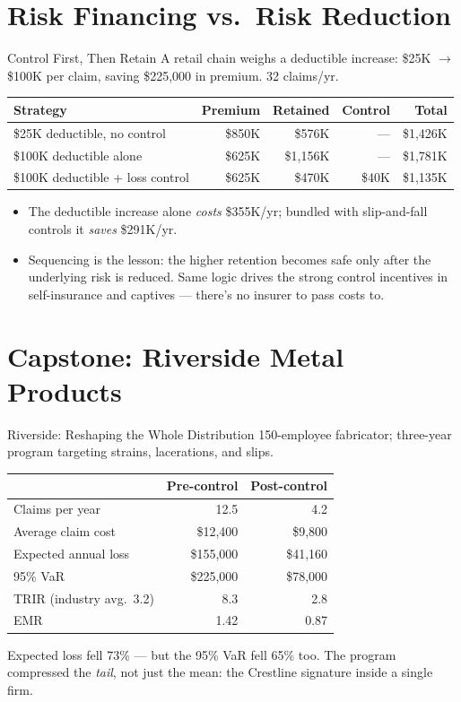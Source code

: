 \documentclass[11pt, aspectratio=169]{beamer}
\begin{document}
\section{Risk Financing vs.\ Risk Reduction}

\begin{frame}{Control First, Then Retain}
A retail chain weighs a deductible increase: \$25K $\rightarrow$ \$100K per claim, saving \$225{,}000 in premium. 32 claims/yr.
\medskip
\begin{center}
\small
\begin{tabular}{lrrrr}
\toprule
\textbf{Strategy} & \textbf{Premium} & \textbf{Retained} & \textbf{Control} & \textbf{Total} \\
\midrule
\$25K deductible, no control & \$850K & \$576K & --- & \$1{,}426K \\
\$100K deductible alone & \$625K & \$1{,}156K & --- & \$1{,}781K \\
\$100K deductible + loss control & \$625K & \$470K & \$40K & \alert{\$1{,}135K} \\
\bottomrule
\end{tabular}
\end{center}
\medskip
\begin{itemize}
  \item The deductible increase alone \emph{costs} \$355K/yr; bundled with slip-and-fall controls it \emph{saves} \$291K/yr.
  \item Sequencing is the lesson: the higher retention becomes safe only after the underlying risk is reduced. Same logic drives the strong control incentives in self-insurance and captives --- there's no insurer to pass costs to.
\end{itemize}
\end{frame}

\section{Capstone: Riverside Metal Products}

\begin{frame}{Riverside: Reshaping the Whole Distribution}
150-employee fabricator; three-year program targeting strains, lacerations, and slips.
\medskip
\begin{center}
\small
\begin{tabular}{lrr}
\toprule
 & \textbf{Pre-control} & \textbf{Post-control} \\
\midrule
Claims per year & 12.5 & 4.2 \\
Average claim cost & \$12{,}400 & \$9{,}800 \\
Expected annual loss & \$155{,}000 & \$41{,}160 \\
95\% VaR & \$225{,}000 & \$78{,}000 \\
TRIR (industry avg.\ 3.2) & 8.3 & 2.8 \\
EMR & 1.42 & 0.87 \\
\bottomrule
\end{tabular}
\end{center}
\medskip
Expected loss fell 73\% --- but the 95\% VaR fell 65\% too. The program compressed the \emph{tail}, not just the mean: the Crestline signature inside a single firm.
\end{frame}
\end{document}
